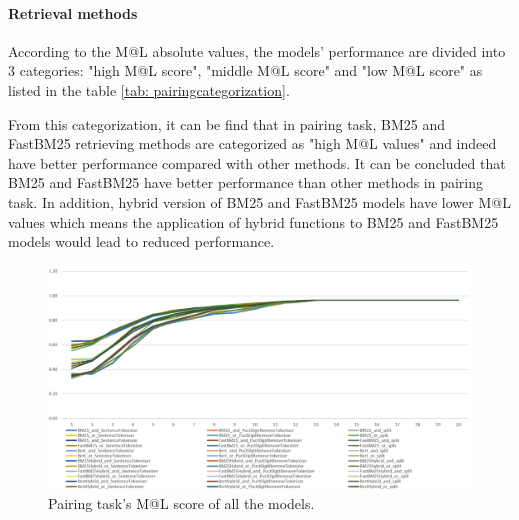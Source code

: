 \documentclass[10pt,a4paper,fleqn]{report}
\begin{document}
			\paragraph{Retrieval methods} %
				According to the M@L absolute values, the models' performance are divided into 3 categories: "high M@L score", "middle M@L score" and "low M@L score" as listed in the table \ref{tab: pairingcategorization}.
				
				From this categorization, it can be find that in pairing task, BM25 and FastBM25 retrieving methods are categorized as "high M@L values" and indeed have better performance compared with other methods. It can be concluded that BM25 and FastBM25 have better performance than other methods in pairing task.
				In addition, hybrid version of BM25 and FastBM25 models have lower M@L values which means 
				the application of hybrid functions to BM25 and FastBM25 models would lead to reduced performance.
				
				\begin{figure}[htbp]
					\centering
					\includegraphics[width=\textwidth]{figure/partB_pairing_M@L_all_models.png}
					\caption[]{Pairing task's M@L score of all the models.}
					\label{fig: pairingtaskmlscore}
				\end{figure}
				
\end{document}
